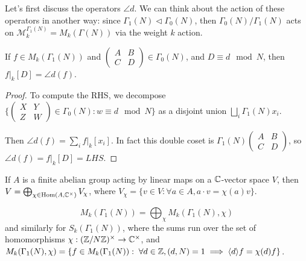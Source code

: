 \documentclass[10pt,a4paper]{article}
\begin{document}
Let's first discuss the operators $\angle{d}$. We can think about the action of these operators in another way: since $\Gamma_1(N) \triangleleft \Gamma_0(N)$, then $\Gamma_0(N)/\Gamma_1(N)$ acts on $\mathcal{M}_k^{\Gamma_1(N)} = M_k(\Gamma(N))$ via the weight $k$ action.
\begin{lemma}
  If $f \in M_k(\Gamma_1(N))$ and $\begin{pmatrix}A&B\\C&D \end{pmatrix} \in \Gamma_0(N)$, and $D \equiv d \mod N$, then $f|_k[D] = \angle{d}(f)$.
\end{lemma}
\begin{proof}
  To compute the RHS, we decompose $\{\begin{pmatrix}X&Y\\Z&W\end{pmatrix}\in \Gamma_0(N) : w \equiv d \mod N\}$ as a disjoint union $\bigsqcup_i \Gamma_1(N) x_i$.

  Then $\angle{d}(f) = \sum_i f|_k [x_i]$. In fact this double coset is $\Gamma_1(N) \begin{pmatrix}A&B\\C&D \end{pmatrix}$, so $\angle{d}(f) = f|_k[D] = LHS$.
\end{proof}
\begin{lemma}
  If $A$ is a finite abelian group acting by linear maps on a $\mathbb{C}$-vector space $V$, then $V = \bigoplus_{\chi \in \operatorname{Hom}(A, \mathbb{C}^\times)}V_\chi$, where $V_\chi = \{v \in V: \forall a \in A, a\cdot v = \chi(a)v\}$.
\end{lemma}
\begin{corollary}
  \[M_k(\Gamma_1(N)) = \bigoplus_\chi M_k(\Gamma_1(N), \chi)\]
  and similarly for $S_k(\Gamma_1(N))$, where the sums run over the set of homomorphisms $\chi:(\mathbb{Z}/N\mathbb{Z})^\times \to \mathbb{C}^\times$, and $M_k(\Gamma_1(N), \chi) = \{f \in M_k(\Gamma_1(N)) : \forall d \in \Z, (d,N) = 1 \implies \angle{d}f = \chi(d)f\}$.
\end{corollary}
\end{document}
